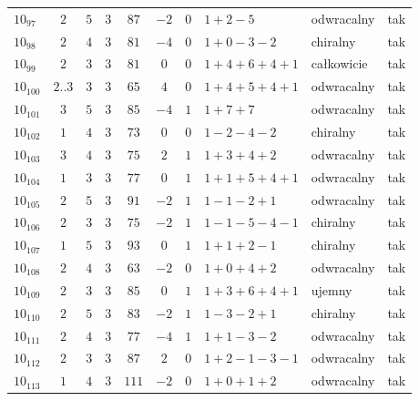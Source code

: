 \begin{longtable}{lccccccllc}
$10_{97}$   &  $2$     &  $5$  &  $3$      &  $87$   &  $-2$  &  $0$  &  $1+2-5$        &  odwracalny  &  tak  \\
$10_{98}$   &  $2$     &  $4$  &  $3$      &  $81$   &  $-4$  &  $0$  &  $1+0-3-2$      &  chiralny    &  tak  \\
$10_{99}$   &  $2$     &  $3$  &  $3$      &  $81$   &  $0$   &  $0$  &  $1+4+6+4+1$    &  całkowicie  &  tak  \\
$10_{100}$  &  $2..3$  &  $3$  &  $3$      &  $65$   &  $4$   &  $0$  &  $1+4+5+4+1$    &  odwracalny  &  tak  \\
$10_{101}$  &  $3$     &  $5$  &  $3$      &  $85$   &  $-4$  &  $1$  &  $1+7+7$        &  odwracalny  &  tak  \\
$10_{102}$  &  $1$     &  $4$  &  $3$      &  $73$   &  $0$   &  $0$  &  $1-2-4-2$      &  chiralny    &  tak  \\
$10_{103}$  &  $3$     &  $4$  &  $3$      &  $75$   &  $2$   &  $1$  &  $1+3+4+2$      &  odwracalny  &  tak  \\
$10_{104}$  &  $1$     &  $3$  &  $3$      &  $77$   &  $0$   &  $1$  &  $1+1+5+4+1$    &  odwracalny  &  tak  \\
$10_{105}$  &  $2$     &  $5$  &  $3$      &  $91$   &  $-2$  &  $1$  &  $1-1-2+1$      &  odwracalny  &  tak  \\
$10_{106}$  &  $2$     &  $3$  &  $3$      &  $75$   &  $-2$  &  $1$  &  $1-1-5-4-1$    &  chiralny    &  tak  \\
$10_{107}$  &  $1$     &  $5$  &  $3$      &  $93$   &  $0$   &  $1$  &  $1+1+2-1$      &  chiralny    &  tak  \\
$10_{108}$  &  $2$     &  $4$  &  $3$      &  $63$   &  $-2$  &  $0$  &  $1+0+4+2$      &  odwracalny  &  tak  \\
$10_{109}$  &  $2$     &  $3$  &  $3$      &  $85$   &  $0$   &  $1$  &  $1+3+6+4+1$    &  ujemny      &  tak  \\
$10_{110}$  &  $2$     &  $5$  &  $3$      &  $83$   &  $-2$  &  $1$  &  $1-3-2+1$      &  chiralny    &  tak  \\
$10_{111}$  &  $2$     &  $4$  &  $3$      &  $77$   &  $-4$  &  $1$  &  $1+1-3-2$      &  odwracalny  &  tak  \\
$10_{112}$  &  $2$     &  $3$  &  $3$      &  $87$   &  $2$   &  $0$  &  $1+2-1-3-1$    &  odwracalny  &  tak  \\
$10_{113}$  &  $1$     &  $4$  &  $3$      &  $111$  &  $-2$  &  $0$  &  $1+0+1+2$      &  odwracalny  &  tak  \\

\end{longtable}
